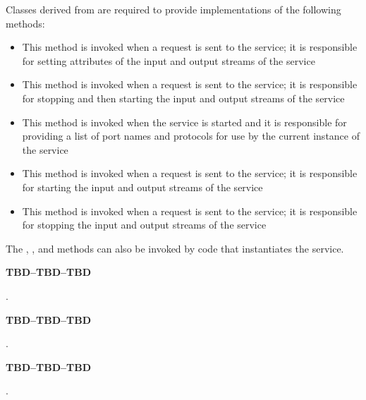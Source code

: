 Classes derived from  are
required to provide implementations of the following methods:
\begin{itemize}
\item \textbf{} This method is invoked when a
 request is sent to the service; it
is responsible for setting attributes of the input and output streams of the service
\item \textbf{} This method is invoked when a
 request is sent to the
service; it is responsible for stopping and then starting the input and output streams of
the service
\item \textbf{} This method is invoked when the service is
started and it is responsible for providing a list of port names and protocols for use by
the current instance of the service
\item \textbf{} This method is invoked when a
 request is sent to the service;
it is responsible for starting the input and output streams of the service
\item \textbf{} This method is invoked when a
 request is sent to the service;
it is responsible for stopping the input and output streams of the service
\end{itemize}
The , ,  and
 methods can also be invoked by code that instantiates the service.
			
			\begin{Large}\textbf{TBD--TBD--TBD}\end{Large}.

\secondaryEnd{}

			\begin{Large}\textbf{TBD--TBD--TBD}\end{Large}.

\secondaryEnd{}

			\begin{Large}\textbf{TBD--TBD--TBD}\end{Large}.

\secondaryEnd{}

